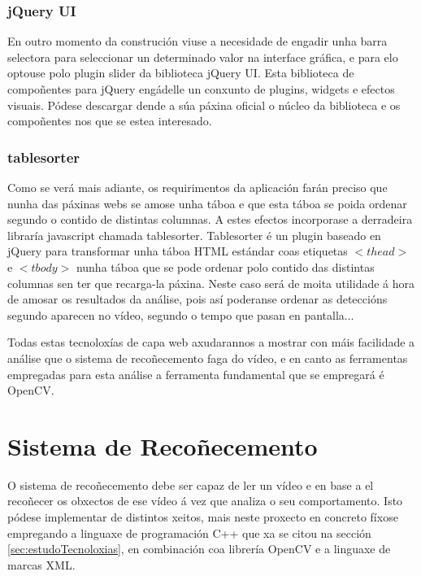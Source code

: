         \subsubsection{jQuery UI}
        
            En outro momento da construción viuse a necesidade de engadir unha barra selectora para
            seleccionar un determinado valor na interface gráfica, e para elo optouse polo plugin 
            slider\cite{ComponenteSliderJqueryUi} da biblioteca jQuery UI. Esta biblioteca de 
            compoñentes para jQuery engádelle un conxunto de plugins, widgets e efectos visuais.
            Pódese descargar dende a súa páxina oficial o núcleo da biblioteca e os compoñentes 
            nos que se estea interesado.
        
        \subsubsection{tablesorter}
        
            Como se verá mais adiante, os requirimentos da aplicación farán preciso que nunha das
            páxinas webs se amose unha táboa e que esta táboa se poida ordenar segundo o contido de
            distintas columnas. A estes efectos incorporase a derradeira libraría javascript chamada
            tablesorter\cite{tablesorter-webPage}. Tablesorter é un plugin baseado en jQuery para transformar 
            unha táboa HTML estándar coas etiquetas $<thead>$ e $<tbody>$ nunha táboa que se pode 
            ordenar polo contido das distintas columnas sen ter que recarga-la páxina. Neste
            caso será de moita utilidade á hora de amosar os resultados da análise, pois así 
            poderanse ordenar as deteccións segundo aparecen no vídeo, segundo o tempo que pasan 
            en pantalla... 
        
    Todas estas tecnoloxías de capa web axudarannos a mostrar con máis facilidade a análise que o
    sistema de recoñecemento faga do vídeo, e en canto as ferramentas empregadas para esta análise
    a ferramenta fundamental que se empregará é OpenCV.
    
\section{Sistema de Recoñecemento}
    O sistema de recoñecemento debe ser capaz de ler un vídeo e en base a el recoñecer os obxectos
    de ese vídeo á vez que analiza o seu comportamento. Isto pódese implementar de distintos xeitos,
    mais neste proxecto en concreto fíxose empregando a linguaxe de programación C++ que xa se citou
    na sección \ref{sec:estudoTecnoloxias}, en combinación coa librería OpenCV e a linguaxe de marcas
    XML.

